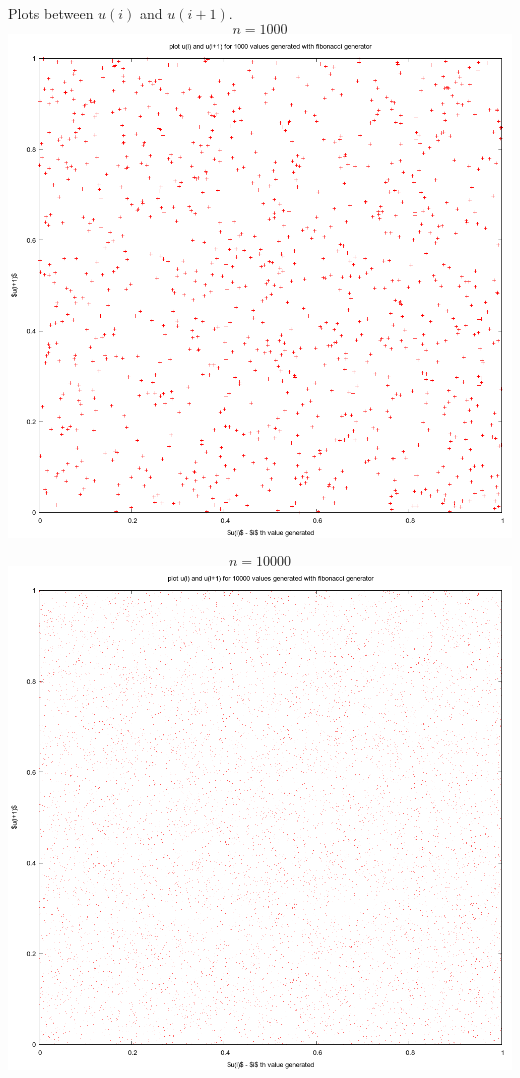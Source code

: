 \documentclass{article}
\begin{document}
Plots between $u(i)$ and $u(i+1)$.\\
$$n = 1000$$
\includegraphics[scale=0.45]{"dataplot2a"}
\pagebreak

$$n = 10000$$
\includegraphics[scale=0.45]{"dataplot2b"}
\pagebreak
\end{document}
